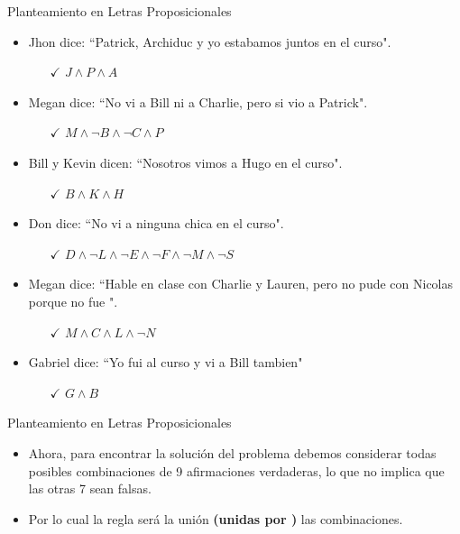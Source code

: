 \documentclass[10pt]{beamer}
\begin{document}
\begin{frame}[fragile]{Planteamiento en Letras Proposicionales}
    \begin{itemize}
    	\item Jhon dice: \textquotedblleft Patrick, Archiduc y yo estabamos juntos en el curso".
    	\begin{itemize}
    		\item [$\checkmark$]  $ J \land P \land A $ 
    	\end{itemize}    
    	\item Megan dice: \textquotedblleft No vi a Bill ni a Charlie, pero si vio a Patrick".
    	\begin{itemize}
    		\item [$\checkmark$] $ M \land \neg B \land \neg C \land P $ 
    	\end{itemize}
    	\item Bill y Kevin dicen: \textquotedblleft Nosotros vimos a Hugo en el curso".
    	\begin{itemize}
    		\item [$\checkmark$]  $ B \land K \land H $ 
    	\end{itemize}
    	\item Don dice: \textquotedblleft No vi a ninguna chica en el curso".
    	\begin{itemize}
    		\item [$\checkmark$]  $ D \land \neg L \land \neg E \land \neg F \land \neg M \land \neg S $ 
    	\end{itemize}
    	\item Megan dice: \textquotedblleft Hable en clase con Charlie y Lauren, pero no pude con Nicolas porque no fue ".
    	\begin{itemize}
    		\item [$\checkmark$]  $ M \land C \land L \land \neg N$
    	\end{itemize}
    	\item Gabriel dice: \textquotedblleft Yo fui al curso y vi a Bill tambien"
    	\begin{itemize}
    		\item [$\checkmark$]  $ G \land B $
    	\end{itemize}
   
    \end{itemize}
\end{frame}

\begin{frame}[fragile]{Planteamiento en Letras Proposicionales}
    \begin{itemize}
        \item Ahora, para encontrar la solución del problema debemos considerar todas posibles combinaciones de 9 afirmaciones verdaderas, lo que no implica que las otras 7 sean falsas. 
        \item Por lo cual la regla será la unión \textbf{(unidas por \boldmath{$\lor$})} las combinaciones.
        
    \end{itemize}
\end{frame}
\end{document}
